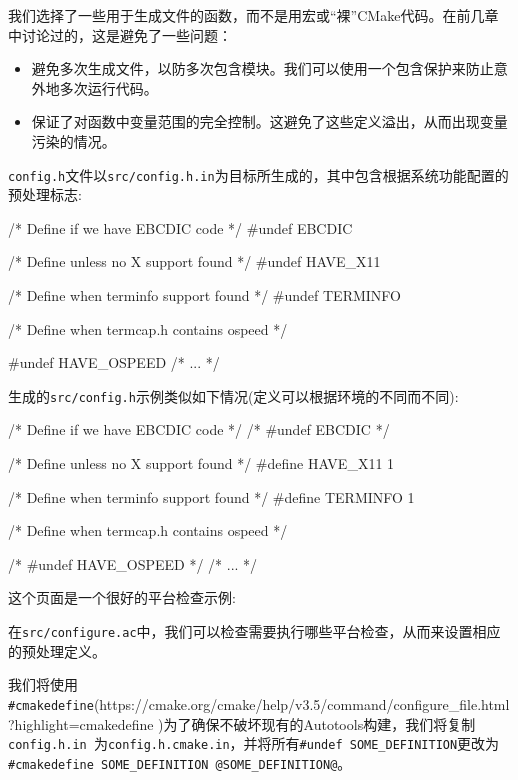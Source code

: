 我们选择了一些用于生成文件的函数，而不是用宏或“裸”CMake代码。在前几章中讨论过的，这是避免了一些问题：

\begin{itemize}
\item 避免多次生成文件，以防多次包含模块。我们可以使用一个包含保护来防止意外地多次运行代码。

\item 保证了对函数中变量范围的完全控制。这避免了这些定义溢出，从而出现变量污染的情况。

\end{itemize}


\texttt{config.h}文件以\texttt{src/config.h.in}为目标所生成的，其中包含根据系统功能配置的预处理标志:

\begin{codebox}[cpp]
/* Define if we have EBCDIC code */
#undef EBCDIC

/* Define unless no X support found */
#undef HAVE_X11

/* Define when terminfo support found */
#undef TERMINFO

/* Define when termcap.h contains ospeed */

#undef HAVE_OSPEED
/* ... */
\end{codebox}

生成的\texttt{src/config.h}示例类似如下情况(定义可以根据环境的不同而不同):

\begin{codebox}[cpp]
/* Define if we have EBCDIC code */
/* #undef EBCDIC */

/* Define unless no X support found */
#define HAVE_X11 1

/* Define when terminfo support found */
#define TERMINFO 1

/* Define when termcap.h contains ospeed */

/* #undef HAVE_OSPEED */
/* ... */
\end{codebox}

这个页面是一个很好的平台检查示例: 

在\texttt{src/configure.ac}中，我们可以检查需要执行哪些平台检查，从而来设置相应的预处理定义。

我们将使用\texttt{\#cmakedefine}(https://cmake.org/cmake/help/v3.5/command/configure\_file.html?highlight=cmakedefine )为了确保不破坏现有的Autotools构建，我们将复制\texttt{ config.h.in }为\texttt{config.h.cmake.in}，并将所有\texttt{\#undef SOME\_DEFINITION}更改为\texttt{\#cmakedefine SOME\_DEFINITION @SOME\_DEFINITION@}。

